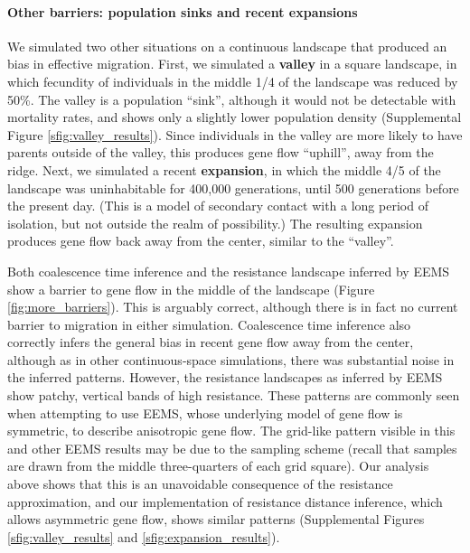 \documentclass{article}
\begin{document}
\paragraph{Other barriers: population sinks and recent expansions}
We simulated two other situations on a continuous landscape that produced an bias in effective migration.
First, we simulated a \textbf{valley} in a square landscape,
in which fecundity of individuals in the middle 1/4 of the landscape was reduced by 50\%.
The valley is a population ``sink'',
although it would not be detectable with mortality rates,
and shows only a slightly lower population density (Supplemental Figure \ref{sfig:valley_results}).
Since individuals in the valley are more likely to have parents outside of the valley,
this produces gene flow ``uphill'', away from the ridge.
Next, we simulated a recent \textbf{expansion},
in which the middle 4/5 of the landscape was uninhabitable for 400,000 generations, 
until 500 generations before the present day.
(This is a model of secondary contact with a long period of isolation,
but not outside the realm of possibility.)
The resulting expansion produces gene flow back away from the center,
similar to the ``valley''.

Both coalescence time inference and the resistance landscape inferred by EEMS
show a barrier to gene flow in the middle of the landscape (Figure \ref{fig:more_barriers}).
This is arguably correct, 
although there is in fact no current barrier to migration in either simulation.
Coalescence time inference also correctly infers 
the general bias in recent gene flow away from the center,
although as in other continuous-space simulations, 
there was substantial noise in the inferred patterns.
However, the resistance landscapes as inferred by EEMS show patchy, vertical bands of high resistance.
These patterns are commonly seen when attempting to use EEMS, 
whose underlying model of gene flow is symmetric,
to describe anisotropic gene flow.
The grid-like pattern visible in this and other EEMS results
may be due to the sampling scheme
(recall that samples are drawn from the middle three-quarters of each grid square). 
Our analysis above shows that this is an unavoidable consequence of the resistance approximation,
and our implementation of resistance distance inference,
which allows asymmetric gene flow, shows similar patterns
(Supplemental Figures \ref{sfig:valley_results} and \ref{sfig:expansion_results}).
\end{document}
